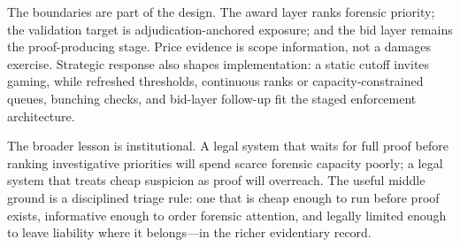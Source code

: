 The boundaries are part of the design. The award layer ranks
forensic priority; the validation target is
adjudication-anchored exposure; and the bid layer remains the
proof-producing stage. Price evidence is scope information, not
a damages exercise. Strategic response also shapes
implementation: a static cutoff invites gaming, while refreshed
thresholds, continuous ranks or capacity-constrained queues,
bunching checks, and bid-layer follow-up fit the staged
enforcement architecture.

The broader lesson is institutional. A legal system that waits
for full proof before ranking investigative priorities will
spend scarce forensic capacity poorly; a legal system that
treats cheap suspicion as proof will overreach. The useful
middle ground is a disciplined triage rule: one that is cheap
enough to run before proof exists, informative enough to order
forensic attention, and legally limited enough to leave
liability where it belongs---in the richer evidentiary record.
